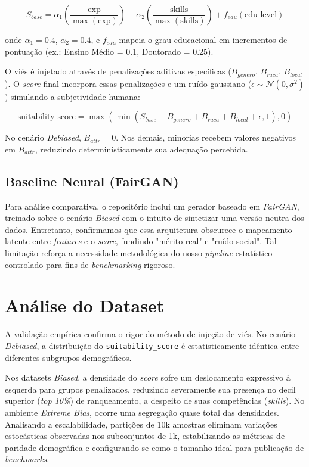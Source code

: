 \documentclass[12pt]{article}
\begin{document}
\begin{equation}
S_{base} = \alpha_1 \left( \frac{\text{exp}}{\max(\text{exp})} \right) + \alpha_2 \left( \frac{\text{skills}}{\max(\text{skills})} \right) + f_{edu}(\text{edu\_level})
\end{equation}

onde $\alpha_1 = 0.4$, $\alpha_2 = 0.4$, e $f_{edu}$ mapeia o grau educacional em incrementos de pontuação (ex.: Ensino Médio = 0.1, Doutorado = 0.25). 

O viés é injetado através de penalizações aditivas específicas ($B_{genero}$, $B_{raca}$, $B_{local}$). O \textit{score} final incorpora essas penalizações e um ruído gaussiano ($\epsilon \sim \mathcal{N}(0, \sigma^2)$) simulando a subjetividade humana:

\begin{equation}
\text{suitability\_score} = \max\left( \min\left( S_{base} + B_{genero} + B_{raca} + B_{local} + \epsilon, 1 \right), 0 \right)
\end{equation}

No cenário \textit{Debiased}, $B_{attr} = 0$. Nos demais, minorias recebem valores negativos em $B_{attr}$, reduzindo deterministicamente sua adequação percebida.

\subsection{Baseline Neural (FairGAN)}

Para análise comparativa, o repositório inclui um gerador baseado em \textit{FairGAN}, treinado sobre o cenário \textit{Biased} com o intuito de sintetizar uma versão neutra dos dados. Entretanto, confirmamos que essa arquitetura obscurece o mapeamento latente entre \textit{features} e o \textit{score}, fundindo "mérito real" e "ruído social". Tal limitação reforça a necessidade metodológica do nosso \textit{pipeline} estatístico controlado para fins de \textit{benchmarking} rigoroso.

\section{Análise do Dataset}

A validação empírica confirma o rigor do método de injeção de viés. No cenário \textit{Debiased}, a distribuição do \texttt{suitability\_score} é estatisticamente idêntica entre diferentes subgrupos demográficos. 

Nos datasets \textit{Biased}, a densidade do \textit{score} sofre um deslocamento expressivo à esquerda para grupos penalizados, reduzindo severamente sua presença no decil superior (\textit{top 10\%}) de ranqueamento, a despeito de suas competências (\textit{skills}). No ambiente \textit{Extreme Bias}, ocorre uma segregação quase total das densidades. Analisando a escalabilidade, partições de 10k amostras eliminam variações estocásticas observadas nos subconjuntos de 1k, estabilizando as métricas de paridade demográfica e configurando-se como o tamanho ideal para publicação de \textit{benchmarks}.
\end{document}
